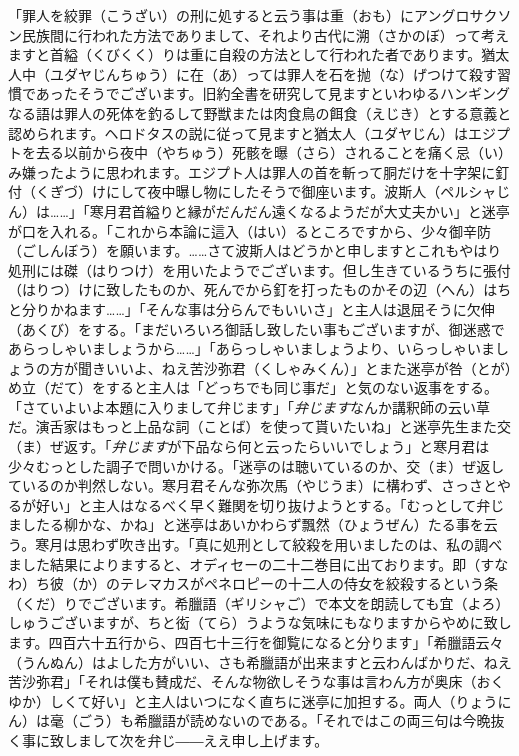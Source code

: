 \documentclass{book}
\begin{document}
「罪人を絞罪（こうざい）の刑に処すると云う事は重（おも）にアングロサクソン民族間に行われた方法でありまして、それより古代に溯（さかのぼ）って考えますと首縊（くびくく）りは重に自殺の方法として行われた者であります。猶太人中（ユダヤじんちゅう）に在（あ）っては罪人を石を抛（な）げつけて殺す習慣であったそうでございます。旧約全書を研究して見ますといわゆるハンギングなる語は罪人の死体を釣るして野獣または肉食鳥の餌食（えじき）とする意義と認められます。ヘロドタスの説に従って見ますと猶太人（ユダヤじん）はエジプトを去る以前から夜中（やちゅう）死骸を曝（さら）されることを痛く忌（い）み嫌ったように思われます。エジプト人は罪人の首を斬って胴だけを十字架に釘付（くぎづ）けにして夜中曝し物にしたそうで御座います。波斯人（ペルシャじん）は\ldots{}\ldots{}」「寒月君首縊りと縁がだんだん遠くなるようだが大丈夫かい」と迷亭が口を入れる。「これから本論に這入（はい）るところですから、少々御辛防（ごしんぼう）を願います。\ldots{}\ldots{}さて波斯人はどうかと申しますとこれもやはり処刑には磔（はりつけ）を用いたようでございます。但し生きているうちに張付（はりつ）けに致したものか、死んでから釘を打ったものかその辺（へん）はちと分りかねます\ldots{}\ldots{}」「そんな事は分らんでもいいさ」と主人は退屈そうに欠伸（あくび）をする。「まだいろいろ御話し致したい事もございますが、御迷惑であらっしゃいましょうから\ldots{}\ldots{}」「あらっしゃいましょうより、いらっしゃいましょうの方が聞きいいよ、ねえ苦沙弥君（くしゃみくん）」とまた迷亭が咎（とが）め立（だて）をすると主人は「どっちでも同じ事だ」と気のない返事をする。「さていよいよ本題に入りまして弁じます」「\emph{弁じます}なんか講釈師の云い草だ。演舌家はもっと上品な詞（ことば）を使って貰いたいね」と迷亭先生また交（ま）ぜ返す。「\emph{弁じます}が下品なら何と云ったらいいでしょう」と寒月君は少々むっとした調子で問いかける。「迷亭のは聴いているのか、交（ま）ぜ返しているのか判然しない。寒月君そんな弥次馬（やじうま）に構わず、さっさとやるが好い」と主人はなるべく早く難関を切り抜けようとする。「むっとして弁じましたる柳かな、かね」と迷亭はあいかわらず飄然（ひょうぜん）たる事を云う。寒月は思わず吹き出す。「真に処刑として絞殺を用いましたのは、私の調べました結果によりますると、オディセーの二十二巻目に出ております。即（すなわ）ち彼（か）のテレマカスがペネロピーの十二人の侍女を絞殺するという条（くだ）りでございます。希臘語（ギリシャご）で本文を朗読しても宜（よろ）しゅうございますが、ちと衒（てら）うような気味にもなりますからやめに致します。四百六十五行から、四百七十三行を御覧になると分ります」「希臘語云々（うんぬん）はよした方がいい、さも希臘語が出来ますと云わんばかりだ、ねえ苦沙弥君」「それは僕も賛成だ、そんな物欲しそうな事は言わん方が奥床（おくゆか）しくて好い」と主人はいつになく直ちに迷亭に加担する。両人（りょうにん）は毫（ごう）も希臘語が読めないのである。「それではこの両三句は今晩抜く事に致しまして次を弁じ――ええ申し上げます。
\end{document}
